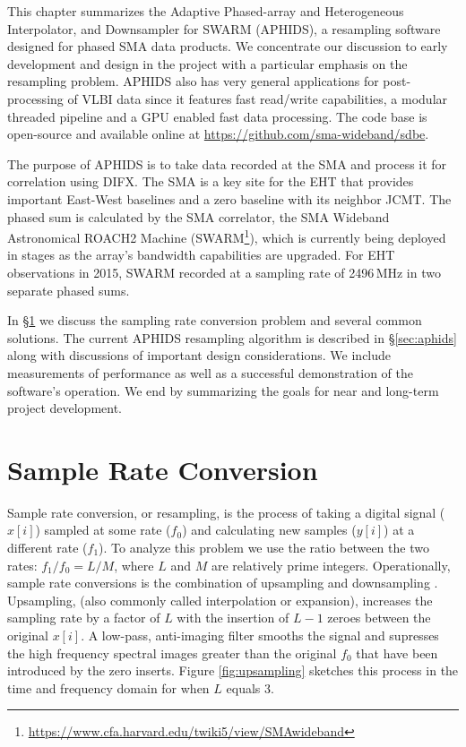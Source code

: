 This chapter summarizes the Adaptive Phased-array and Heterogeneous 
Interpolator, and Downsampler for SWARM (APHIDS), a resampling software designed for 
phased SMA data products.  We concentrate our discussion to early development and design in the project with 
a particular emphasis on the resampling problem.  APHIDS also has very general applications for 
post-processing of VLBI data since it features fast read/write capabilities, a modular threaded pipeline 
and a GPU enabled fast data processing.  The code base is open-source and available online at 
\url{https://github.com/sma-wideband/sdbe}.

The purpose of APHIDS is to take data recorded at the SMA and process it for correlation using
DIFX.  The SMA is a key site for the EHT that provides important East-West baselines and a zero baseline with 
its neighbor JCMT.  The phased sum is calculated by the SMA correlator, the SMA Wideband Astronomical 
ROACH2 Machine (SWARM\footnote{\url{https://www.cfa.harvard.edu/twiki5/view/SMAwideband}}),
which is currently being deployed in stages as the array's bandwidth capabilities are 
upgraded.  For EHT observations in 2015, SWARM recorded at a sampling rate of 2496\,MHz in two separate phased
sums.

In \S\ref{sec:src_basics} we discuss the sampling rate conversion problem and several common solutions.
The current APHIDS resampling algorithm is described in \S\ref{sec:aphids} along with discussions of important
design considerations.  We include measurements of performance as well as a successful
demonstration of the software's operation.  We end by summarizing the goals for near and long-term project 
development.

\section{Sample Rate Conversion} \label{sec:src_basics}

Sample rate conversion, or resampling, is the process of taking a digital signal ($x[i]$) sampled at some rate 
($f_0$) and calculating new samples ($y[i]$) at a different rate ($f_1$).  To analyze this problem we use the 
ratio between the two rates: $f_1/f_0 = L/M$, where $L$ and $M$ are relatively prime integers.  Operationally, 
sample rate conversions is the combination of upsampling and downsampling \citep{oppenheim10,lyons11}.  
Upsampling, (also commonly called interpolation or expansion), increases the sampling rate 
by a factor of $L$ with the insertion of $L-1$ zeroes between the original $x[i]$.  A low-pass, 
anti-imaging filter smooths the signal and supresses the high frequency spectral images greater than the original 
$f_0$ that have been introduced by the zero inserts.  Figure \ref{fig:upsampling} sketches this process in the 
time and frequency domain for when $L$ equals 3. 

